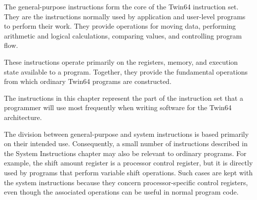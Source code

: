 %
%

The general-purpose instructions form the core of the Twin64 instruction set. They are the instructions normally used by application and user-level programs to perform their work. They provide operations for moving data, performing arithmetic and logical calculations, comparing values, and controlling program flow.

These instructions operate primarily on the registers, memory, and execution state available to a program. Together, they provide the fundamental operations from which ordinary Twin64 programs are constructed.

The instructions in this chapter represent the part of the instruction set that a programmer will use most frequently when writing software for the Twin64 architecture.

The division between general-purpose and system instructions is based primarily on their intended use. Consequently, a small number of instructions described in the System Instructions chapter may also be relevant to ordinary programs. For example, the shift amount register is a processor control register, but it is directly used by programs that perform variable shift operations. Such cases are kept with the system instructions because they concern processor-specific control registers, even though the associated operations can be useful in normal program code.

